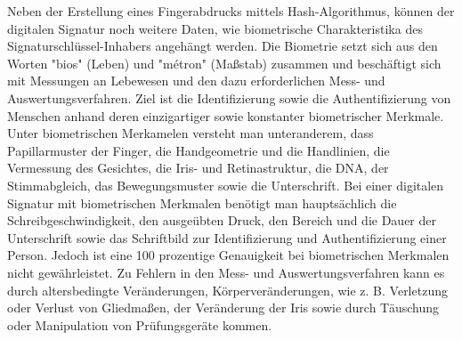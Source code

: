 Neben der Erstellung eines Fingerabdrucks mittels Hash-Algorithmus, können der digitalen Signatur noch weitere Daten, wie biometrische Charakteristika des Signaturschlüssel-Inhabers angehängt werden. Die Biometrie setzt sich aus den Worten "bios" (Leben) und "métron" (Maßstab) zusammen und beschäftigt sich mit Messungen an Lebewesen und den dazu erforderlichen Mess- und Auswertungsverfahren. \cite{bioMet1} Ziel ist die Identifizierung sowie die Authentifizierung von Menschen anhand deren einzigartiger sowie konstanter biometrischer Merkmale. Unter biometrischen Merkamelen versteht man unteranderem, dass Papillarmuster der Finger, die Handgeometrie und die Handlinien, die Vermessung des Gesichtes, die Iris- und Retinastruktur, die DNA, der Stimmabgleich, das Bewegungsmuster sowie die Unterschrift. Bei einer digitalen Signatur mit biometrischen Merkmalen benötigt man hauptsächlich die Schreibgeschwindigkeit, den ausgeübten Druck, den Bereich und die Dauer der Unterschrift sowie das Schriftbild zur Identifizierung und Authentifizierung einer Person. Jedoch ist eine 100 prozentige Genauigkeit bei biometrischen Merkmalen nicht gewährleistet. Zu Fehlern in den Mess- und Auswertungsverfahren kann es durch altersbedingte Veränderungen, Körperveränderungen, wie z. B. Verletzung oder Verlust von Gliedmaßen, der Veränderung der Iris sowie durch Täuschung oder Manipulation von Prüfungsgeräte kommen. \cite{bioMet2}\cite{bioMet3}